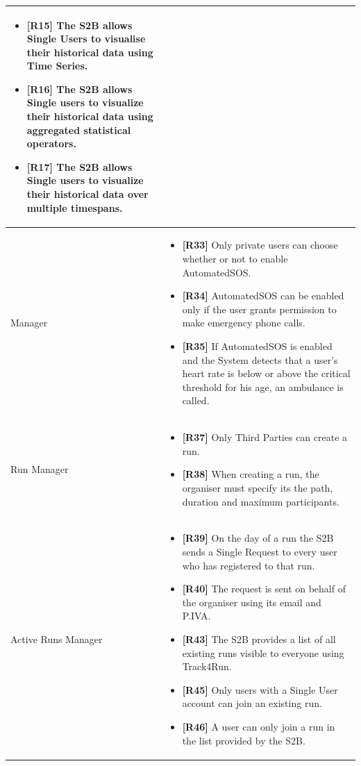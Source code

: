 \documentclass[titlepage]{article}
\begin{document}
\begin{longtable}{| p{5 cm} | p{8 cm} |}
\begin{itemize}
			\item {\bf [R15]} The S2B allows Single Users to visualise their historical data using Time Series. 
			\item {\bf [R16]} The S2B allows Single users to visualize their historical data using aggregated statistical operators. 
			\item {\bf [R17]} The S2B allows Single users to visualize their historical data over multiple timespans.
		\end{itemize}		
		\\	 \hline
		\newline {\it AutomatedSOS} Manager & 
		\begin{itemize}
			\item {\bf [R33]} Only private users can choose whether or not to enable AutomatedSOS. 
			\item {\bf [R34]} AutomatedSOS can be enabled only if the user grants permission to make emergency phone calls. 
			\item {\bf [R35]} If AutomatedSOS is enabled and the System detects that a user’s heart rate is below or above the critical threshold for his age, an ambulance is called. 
		\end{itemize}		
		\\	 \hline
		\newline Run Manager & 
		\begin{itemize}
			\item {\bf [R37]} Only Third Parties can create a run.
			\item {\bf [R38]} When creating a run, the organiser must specify its the path, duration and maximum participants.
		\end{itemize}		
		\\	 \hline	
		\newline Active Runs Manager & 
		\begin{itemize}
			\item {\bf [R39]} On the day of a run the S2B sends a Single Request to every user who has registered to that run.
			\item {\bf [R40]} The request is sent on behalf of the organiser using its email and P.IVA.
			\item {\bf [R43]} The S2B provides a list of all existing runs visible to everyone using Track4Run.
			\item {\bf [R45]} Only users with a Single User account can join an existing run.
			\item {\bf [R46]} A user can only join a run in the list provided by the S2B.

\end{itemize}
\end{longtable}
\end{document}
